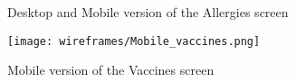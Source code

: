 \begin{figure}[ht]
    \centering
    \hspace{0.05\textwidth}
    \caption{Desktop and Mobile version of the Allergies screen}
\end{figure}

\begin{figure}[ht]
    \centering
    \texttt{[image: wireframes/Mobile\_vaccines.png]}
    \caption{Mobile version of the Vaccines screen}
\end{figure}